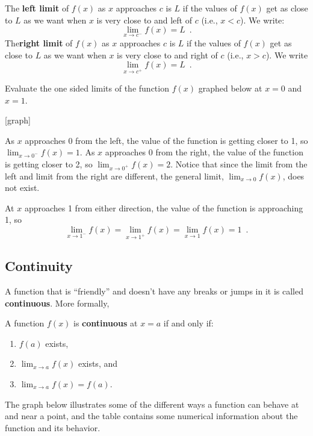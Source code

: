 The {\bf left limit} of $f(x)$ as $x$ approaches $c$ is $L$ if the values of $f(x)$ get as close to $L$ as we want when $x$ is very close to and left of $c$ (i.e., $x<c$). We write:
$$\lim_{x\to c^-}f(x)=L \enspace .$$
The{\bf right limit} of $f(x)$ as $x$ approaches $c$ is $L$ if the values of $f(x)$ get as close to $L$ as we want when $x$ is very close to and right of $c$ (i.e., $x>c$). We write
$$\lim_{x\to c^+}f(x)=L \enspace .$$
\begin{example}
Evaluate the one sided limits of the function $f(x)$ graphed below at $x=0$ and $x=1$.

[graph]

\begin{solution} As $x$ approaches 0 from the left, the value of the function is getting closer to 1, so $\displaystyle\lim_{x\to 0^-}f(x)=1$.
As $x$ approaches 0 from the right, the value of the function is getting closer to 2, so $\displaystyle\lim_{x\to 0^+}f(x)=2$.
Notice that since the limit from the left and limit from the right are different, the general limit, $\displaystyle\lim_{x\to 0}f(x)$, does not exist.

At $x$ approaches 1 from either direction, the value of the function is approaching 1, so
$$\lim_{x\to 1^-}f(x)=\lim_{x\to 1^+}f(x)=\lim_{x\to 1}f(x)=1 \enspace.$$
\end{solution}\end{example}

\subsection{Continuity}
\label{ssec:continuity}
A function that is ``friendly'' and doesn't have any breaks or jumps in it is called {\bf continuous}. More formally,

\begin{definition}
A function $f(x)$ is {\bf continuous} at $x=a$ if and only if:
    \begin{enumerate}
    \item $f(a)$ exists,
    \item $\displaystyle\lim_{x\to a}f(x)$ exists, and 
    \item $\displaystyle\lim_{x\to a}f(x)=f(a)$.
    \end{enumerate}
\end{definition}
The graph below illustrates some of the different ways a function can behave at and near a point, and the table contains some numerical information about the function and its behavior.


